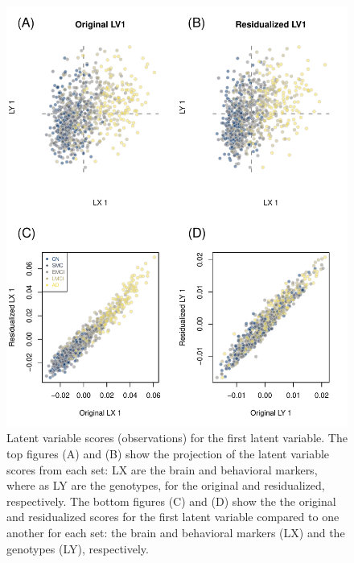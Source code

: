 \documentclass[12pt]{article}
\begin{document}
\begin{figure}[!hbtp]

{\centering \includegraphics[width=.8\textwidth,height=.8\textheight]{PLSCAR_to_a_GPLS_files/figure-latex/unnamed-chunk-11-1} 

}

\caption{\label{fig:lv_compare_ex2} Latent variable scores (observations) for the first latent variable. The top figures (A) and (B) show the projection of the latent variable scores from each set: LX are the brain and behavioral markers, where as LY are the genotypes, for the original and residualized, respectively. The bottom figures (C) and (D) show the the original and residualized scores for the first latent variable compared to one another for each set: the brain and behavioral markers (LX) and the genotypes (LY), respectively.}\label{fig:unnamed-chunk-11}
\end{figure}
\end{document}
